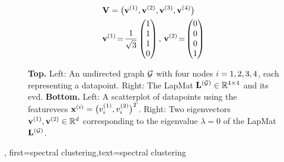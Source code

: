 {{\begin{figure}[H]
\begin{center}
\begin{minipage}{0.4\textwidth}
\begin{equation}
						\nonumber
					\end{equation} 
				\end{minipage}
				\vspace*{20mm}\\
				  \begin{minipage}{0.4\textwidth}
				\end{minipage} 
    		\begin{minipage}{0.4\textwidth}
										\begin{align}
											& \mathbf{V} = \big( {\bf v}^{(1)},{\bf v}^{(2)},{\bf v}^{(3)},{\bf v}^{(4)} \big) \nonumber \\
											&	\mathbf{v}^{(1)}\!=\!\frac{1}{\sqrt{3}} \begin{pmatrix} 1 \\ 1 \\ 1 \\ 0 \end{pmatrix}, \,
												\mathbf{v}^{(2)}\!=\!\begin{pmatrix} 0 \\ 0 \\ 0 \\ 1 \end{pmatrix} \nonumber 
												\end{align}
				\end{minipage} 
				\caption{\label{fig_lap_mtx_specclustering_dict} {\bf Top.} Left: An undirected \gls{graph} 
					$\mathcal{G}$ with four nodes $i=1,2,3,4$, each representing a \gls{datapoint}. Right: The \gls{LapMat} 
					${\bf L}^{(\mathcal{G})}  \in \mathbb{R}^{4 \times 4}$ and its \gls{evd}. 
					{\bf Bottom.} Left: A \gls{scatterplot} of \gls{datapoint}s using the \gls{featurevec}s 
					${\bf x}^{(i)} = \big( v^{(1)}_{i},v^{(2)}_{i} \big)^{T}$. 
					Right: Two \gls{eigenvector}s ${\bf v}^{(1)},{\bf v}^{(2)} \in \mathbb{R}^{d}$ 
					corresponding to the \gls{eigenvalue} $\lambda=0$ of the \gls{LapMat} ${\bf L}^{(\mathcal{G})}$. 
					} 
			\end{center}
		\end{figure}
	\newpage}, 
	first={spectral clustering},text={spectral clustering} 
}


